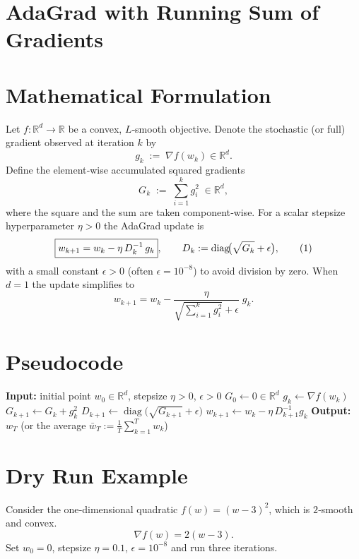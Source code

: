 \documentclass{article}
\newcommand{\RR}{\mathbb{R}}
\begin{document}
\section*{AdaGrad with Running Sum of Gradients}

\section*{Mathematical Formulation}
Let $f:\RR^{d}\rightarrow\RR$ be a convex, $L$‑smooth objective.  
Denote the stochastic (or full) gradient observed at iteration $k$ by 
\[
g_{k}\;:=\;\nabla f(w_{k})\in\RR^{d}.
\]
Define the element‑wise accumulated squared gradients
\[
G_{k}\;:=\;\sum_{i=1}^{k} g_{i}^{2}\;\in\RR^{d},
\]
where the square and the sum are taken component‑wise.  
For a scalar stepsize hyperparameter $\eta>0$ the AdaGrad update is
\[
\boxed{%
w_{k+1}=w_{k}-\eta \, D_{k}^{-1}\, g_{k}},\qquad 
D_{k}:=\operatorname{diag}\!\bigl(\sqrt{G_{k}}+\epsilon\bigr),
\tag{1}
\]
with a small constant $\epsilon>0$ (often $\epsilon=10^{-8}$) to avoid division by zero.  
When $d=1$ the update simplifies to
\[
w_{k+1}=w_{k}-\frac{\eta}{\sqrt{\sum_{i=1}^{k} g_{i}^{2}}+\epsilon}\;g_{k}.
\tag{2}
\]

\section*{Pseudocode}
\begin{algorithm}[H]
\caption{AdaGrad (vector version)}\label{alg:adagrad}
\begin{algorithmic}[1]
\State \textbf{Input:} initial point $w_{0}\in\RR^{d}$, stepsize $\eta>0$, $\epsilon>0$
\State $G_{0}\gets 0\in\RR^{d}$ 
    \State $g_{k}\gets\nabla f(w_{k})$ 
    \State $G_{k+1}\gets G_{k}+g_{k}^{2}$ 
    \State $D_{k+1}\gets\operatorname{diag}\!\bigl(\sqrt{G_{k+1}}+\epsilon\bigr)$
    \State $w_{k+1}\gets w_{k}-\eta\, D_{k+1}^{-1} g_{k}$
\EndFor
\State \textbf{Output:} $w_{T}$ (or the average $\bar w_T:=\tfrac1T\sum_{k=1}^{T}w_{k}$)
\end{algorithmic}
\end{algorithm}

\section*{Dry Run Example}
Consider the one‑dimensional quadratic $f(w)=(w-3)^{2}$, which is $2$‑smooth and convex.
\[
\nabla f(w)=2(w-3).
\]
Set $w_{0}=0$, stepsize $\eta=0.1$, $\epsilon=10^{-8}$ and run three iterations.
\end{document}

